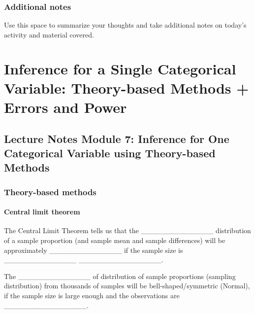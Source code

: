 \documentclass[
]{report}
\begin{document}
\hypertarget{additional-notes-9}{%
\subsection{Additional notes}\label{additional-notes-9}}

Use this space to summarize your thoughts and take additional notes on today's activity and material covered.

\newpage

\hypertarget{inference-for-a-single-categorical-variable-theory-based-methods-errors-and-power}{%
\chapter{Inference for a Single Categorical Variable: Theory-based Methods + Errors and Power}\label{inference-for-a-single-categorical-variable-theory-based-methods-errors-and-power}}

\hypertarget{lecture-notes-module-7-inference-for-one-categorical-variable-using-theory-based-methods}{%
\section{Lecture Notes Module 7: Inference for One Categorical Variable using Theory-based Methods}\label{lecture-notes-module-7-inference-for-one-categorical-variable-using-theory-based-methods}}


\hypertarget{theory-based-methods}{%
\subsection*{Theory-based methods}\label{theory-based-methods}}

\hypertarget{central-limit-theorem}{%
\subsubsection*{Central limit theorem}\label{central-limit-theorem}}

The Central Limit Theorem tells us that the \_\_\_\_\_\_\_\_\_\_\_\_\_\_ distribution of a sample proportion (and sample mean and sample differences) will be approximately \_\_\_\_\_\_\_\_\_\_\_\_\_\_ if the sample size is \_\_\_\_\_\_\_\_\_\_\_\_\_\_ \_\_\_\_\_\_\_\_\_\_\_\_\_\_\_\_.

The \_\_\_\_\_\_\_\_\_\_\_\_\_\_ of distribution of sample proportions (sampling distribution) from thousands of samples will be bell-shaped/symmetric (Normal), if the sample size is large enough and the observations are \_\_\_\_\_\_\_\_\_\_\_\_\_\_\_\_.
\end{document}
